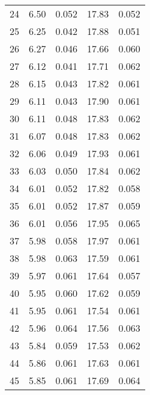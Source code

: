 \begin{table}
\begin{tabular}{c|ll|ll}
24 & 6.50 & 0.052 & 17.83 & 0.052 \\
25 & 6.25 & 0.042 & 17.88 & 0.051 \\
26 & 6.27 & 0.046 & 17.66 & 0.060 \\
27 & 6.12 & 0.041 & 17.71 & 0.062 \\
28 & 6.15 & 0.043 & 17.82 & 0.061 \\
29 & 6.11 & 0.043 & 17.90 & 0.061 \\
30 & 6.11 & 0.048 & 17.83 & 0.062 \\
31 & 6.07 & 0.048 & 17.83 & 0.062 \\
32 & 6.06 & 0.049 & 17.93 & 0.061 \\
33 & 6.03 & 0.050 & 17.84 & 0.062 \\
34 & 6.01 & 0.052 & 17.82 & 0.058 \\
35 & 6.01 & 0.052 & 17.87 & 0.059 \\
36 & 6.01 & 0.056 & 17.95 & 0.065 \\
37 & 5.98 & 0.058 & 17.97 & 0.061 \\
38 & 5.98 & 0.063 & 17.59 & 0.061 \\
39 & 5.97 & 0.061 & 17.64 & 0.057 \\
40 & 5.95 & 0.060 & 17.62 & 0.059 \\
41 & 5.95 & 0.061 & 17.54 & 0.061 \\
42 & 5.96 & 0.064 & 17.56 & 0.063 \\
43 & 5.84 & 0.059 & 17.53 & 0.062 \\
44 & 5.86 & 0.061 & 17.63 & 0.061 \\
45 & 5.85 & 0.061 & 17.69 & 0.064 \\
               \hline
        \end{tabular}
    \end{table}
    \clearpage

